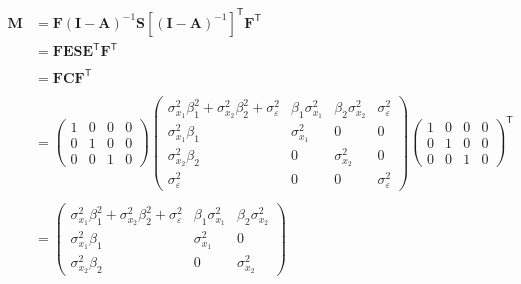 \documentclass[
]{book}
\theoremstyle{definition}
\theoremstyle{definition}
\theoremstyle{definition}
\theoremstyle{remark}
\begin{document}
\begin{align*}\mathbf{M} &=\mathbf{F} \left( \mathbf{I} - \mathbf{A} \right)^{-1} \mathbf{S} \left[ \left( \mathbf{I} - \mathbf{A} \right)^{-1} \right]^{\mathsf{T}} \mathbf{F}^{\mathsf{T}}\\ &=\mathbf{F} \mathbf{E} \mathbf{S} \mathbf{E}^{\mathsf{T}} \mathbf{F}^{\mathsf{T}} \\\\ &=\mathbf{F} \mathbf{C} \mathbf{F}^{\mathsf{T}} \\\\ &=\left( \begin{array}{cccc} 1 & 0 & 0 & 0 \\ 0 & 1 & 0 & 0 \\ 0 & 0 & 1 & 0 \end{array} \right)\left( \begin{array}{cccc} \sigma  _{x_{1}} ^{2} \beta  _{1} ^{2} + \sigma  _{x_{2}} ^{2} \beta  _{2} ^{2} + \sigma  _{\varepsilon } ^{2} & \beta  _{1} \sigma  _{x_{1}} ^{2} & \beta  _{2} \sigma  _{x_{2}} ^{2} & \sigma  _{\varepsilon } ^{2} \\ \sigma  _{x_{1}} ^{2} \beta  _{1} & \sigma  _{x_{1}} ^{2} & 0 & 0 \\ \sigma  _{x_{2}} ^{2} \beta  _{2} & 0 & \sigma  _{x_{2}} ^{2} & 0 \\ \sigma  _{\varepsilon } ^{2} & 0 & 0 & \sigma  _{\varepsilon } ^{2} \end{array} \right)\left( \begin{array}{cccc} 1 & 0 & 0 & 0 \\ 0 & 1 & 0 & 0 \\ 0 & 0 & 1 & 0 \end{array} \right)^{\mathsf{T}} \\\\ &=\left( \begin{array}{ccc} \sigma  _{x_{1}} ^{2} \beta  _{1} ^{2} + \sigma  _{x_{2}} ^{2} \beta  _{2} ^{2} + \sigma  _{\varepsilon } ^{2} & \beta  _{1} \sigma  _{x_{1}} ^{2} & \beta  _{2} \sigma  _{x_{2}} ^{2} \\ \sigma  _{x_{1}} ^{2} \beta  _{1} & \sigma  _{x_{1}} ^{2} & 0 \\ \sigma  _{x_{2}} ^{2} \beta  _{2} & 0 & \sigma  _{x_{2}} ^{2} \end{array} \right)\end{align*}
\end{document}
